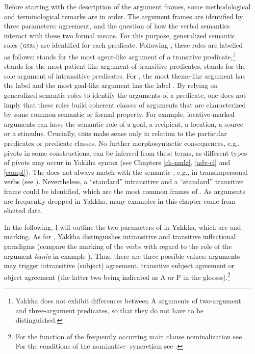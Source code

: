 Before starting with the description of the argument frames, some methodological and terminological remarks are in order. The argument frames are identified by three parameters:  agreement,   and the question of how the verbal semantics interact with these two formal means. For this purpose, generalized semantic roles (\textsc{gsr}s) are identified for each predicate. Following \citet{Bickel2010_Grammatical}, these roles are labelled as follows:  stands for the most agent-like argument of a transitive predicate,\footnote{Yakkha does not exhibit differences between A arguments of two-argument and three-argument predicates, so that they do not have to be distinguished.}  stands for the most patient-like argument of transitive predicates,  stands for the sole argument of intransitive predicates. For , the most theme-like argument has the label  and the most goal-like argument has the label .  By relying on generalized semantic roles to identify the arguments of a predicate, one does not imply that these roles build coherent  classes of arguments that are characterized by some common semantic or formal property. For example, locative-marked arguments can have the semantic role of a goal, a recipient, a location, a source or a stimulus. Crucially, \textsc{gsr}s make sense only in relation to the particular predicates or predicate classes. No further morphosyntactic consequences, e.g., pivots in some constructions, can be inferred from these terms, as different types of pivots may occur in Yakkha syntax (see Chapters \ref{ch-nmlz}, \ref{adv-cl} and \ref{compl}). The  does not always match with the semantic , e.g., in transimpersonal verbs (see ). Nevertheless, a “standard” intransitive and a “standard” transitive frame could be identified, which are the most common frames of . As arguments are frequently dropped in Yakkha, many examples in this chapter come from elicited data.

In the following, I will outline the two parameters of  in Yakkha, which are  and  marking. 
As for , Yakkha distinguishes intransitive and transitive inflectional paradigms (compare the marking of the verbs with regard to the role of the  argument \emph{kaniŋ} in example \Next). Thus, there are three possible values: arguments may trigger intransitive (subject) agreement, transitive subject agreement or object agreement (the latter two being indicated as A or P in the glosses).\footnote{For the function of the frequently occurring main clause nominalization see . For the conditions of the nominative- syncretism see .} 

